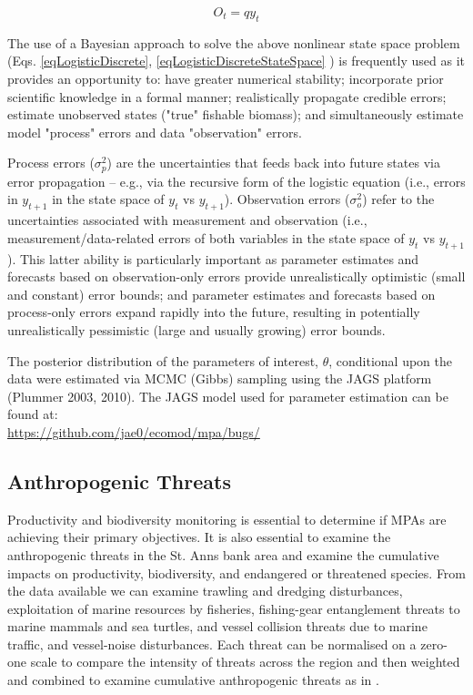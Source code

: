 \documentclass[letterpaper,portrait,11pt]{scrartcl}
\numberwithin{equation}{section}		%
\numberwithin{figure}{section}		%
\numberwithin{table}{section}				%
\begin{document}
\begin{equation} 
\label{eqLogisticDiscreteStateSpace}
O_t = q y_t
\end{equation}


The use of a Bayesian approach to solve the above nonlinear state space problem (Eqs. \ref{eqLogisticDiscrete}, \ref{eqLogisticDiscreteStateSpace} ) is frequently used as it provides an opportunity to: have greater numerical stability;  incorporate prior scientific knowledge in a formal manner; realistically propagate credible errors; estimate unobserved states ("true" fishable biomass); and simultaneously estimate model "process" errors and data "observation" errors. 

Process errors ($\sigma^2_p$) are the uncertainties that feeds back into future states via error propagation -- e.g., via the recursive form of the logistic equation (i.e., errors in $y_{t+1}$ in the state space of $y_t$ vs $y_{t+1}$). Observation errors ($\sigma^2_o$) refer to the uncertainties associated with measurement and observation (i.e., measurement/data-related errors of both variables in the state space of $y_t$ vs $y_{t+1}$). This latter ability is particularly important as parameter estimates and forecasts based on observation-only errors provide unrealistically optimistic (small and constant) error bounds; and parameter estimates and forecasts based on process-only errors expand rapidly into the future, resulting in potentially unrealistically pessimistic (large and usually growing) error bounds.

The posterior distribution of the parameters of interest, $\theta$, conditional upon the data were estimated via MCMC (Gibbs) sampling using the JAGS platform (Plummer 2003, 2010). The JAGS model used for parameter estimation can be found at: \\

\url{https://github.com/jae0/ecomod/mpa/bugs/}

\subsection{Anthropogenic Threats}
Productivity and biodiversity monitoring is essential to determine if MPAs are achieving their primary objectives. It is also essential to examine the anthropogenic threats in the St. Anns bank area and examine the cumulative impacts on productivity, biodiversity, and endangered or threatened species.  From the data available we can examine trawling and dredging disturbances, exploitation of marine resources by fisheries, fishing-gear entanglement threats to marine mammals and sea turtles, and vessel collision threats due to marine traffic, and vessel-noise disturbances.  Each threat can be normalised on a zero-one scale to compare the intensity of threats across the region and then weighted and combined to examine cumulative anthropogenic threats as in \textcite{coll:2012:mediterranean}.
\end{document}
